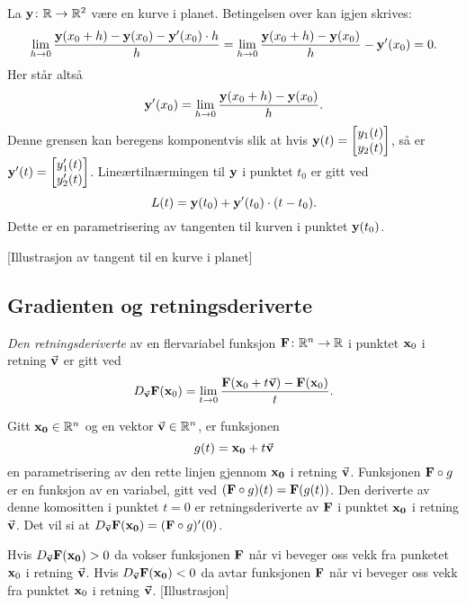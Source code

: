 \begin{eksempel}
  La $\mathbf{y} \colon \mathbb{R} \to \mathbb{R}^2$ være en kurve i planet. Betingelsen over kan igjen skrives:
  $$\lim_{h\to 0} \frac{\mathbf{y}(x_0+h) - \mathbf{y}(x_0) - \mathbf{y}'(x_0) \cdot h}{h} =
  \lim_{h\to 0} \frac{\mathbf{y}(x_0+h) - \mathbf{y}(x_0)}{h} - \mathbf{y}'(x_0) = 0.$$
  Her står altså 
  $$\mathbf{y}'(x_0) = \lim_{h\to 0} \frac{\mathbf{y}(x_0+h) - \mathbf{y}(x_0)}{h}.$$
  Denne grensen kan beregens komponentvis slik at hvis $\mathbf{y}(t) =
  \begin{bmatrix} y_1(t) \\ y_2(t) \end{bmatrix}$, så er $\mathbf{y}'(t) =
  \begin{bmatrix} y_1'(t) \\ y_2'(t) \end{bmatrix}$.
  Lineærtilnærmingen til $\mathbf{y}$ i punktet $t_0$ er gitt ved
  $$L(t) = \mathbf{y}(t_0) + \mathbf{y}'(t_0) \cdot (t - t_0).$$
  Dette er en parametrisering av tangenten til kurven i punktet $\mathbf{y}(t_0)$.
\end{eksempel}
[Illustrasjon av tangent til en kurve i planet]
\subsection{Gradienten og retningsderiverte}
\begin{definisjon}
  {\em Den retningsderiverte} av en flervariabel funksjon $\mathbf{F} \colon \mathbb{R}^n \to
  \mathbb{R}$ i punktet $\mathbf{x}_0$ i retning $\vec{\mathbf{v}}$ er gitt ved
  $$D_{\vec{\mathbf{v}}} \mathbf{F}(\mathbf{x}_0) = \lim_{t\to 0} \frac{\mathbf{F}(\mathbf{x}_0 + t\vec{\mathbf{v}}) - \mathbf{F}(\mathbf{x}_0)}{t}.$$
\end{definisjon}
Gitt $\mathbf{x_0} \in \mathbb{R}^n$ og en vektor $\vec{\mathbf{v}} \in \mathbb{R}^n$, er funksjonen 
$$g(t) = \mathbf{x_0} + t\vec{\mathbf{v}}$$
en parametrisering av den rette linjen gjennom $\mathbf{x_0}$ i retning $\vec{\mathbf{v}}$.
Funksjonen $\mathbf{F} \circ g$ er en funksjon av en variabel, gitt ved $(\mathbf{F} \circ g)(t) = \mathbf{F}(g(t))$.
Den deriverte av denne komositten
i punktet $t=0$ er retningsderiverte av $\mathbf{F}$ i punktet $\mathbf{x_0}$ i retning
$\vec{\mathbf{v}}$. Det vil si at
$D_{\vec{\mathbf{v}}} \mathbf{F}(\mathbf{x_0}) = (\mathbf{F} \circ g)'(0)$.

Hvis $D_{\vec{\mathbf{v}}} \mathbf{F}(\mathbf{x_0}) > 0$ da vokser funksjonen $\mathbf{F}$ når vi beveger oss
vekk fra punketet $\mathbf{x}_0$ i retning $\vec{\mathbf{v}}$. Hvis $D_{\vec{\mathbf{v}}} \mathbf{F}(\mathbf{x_0}) < 0$ da
avtar funksjonen $\mathbf{F}$ når vi beveger oss vekk fra punktet $\mathbf{x}_0$ i retning $\vec{\mathbf{v}}$.
[Illustrasjon]
